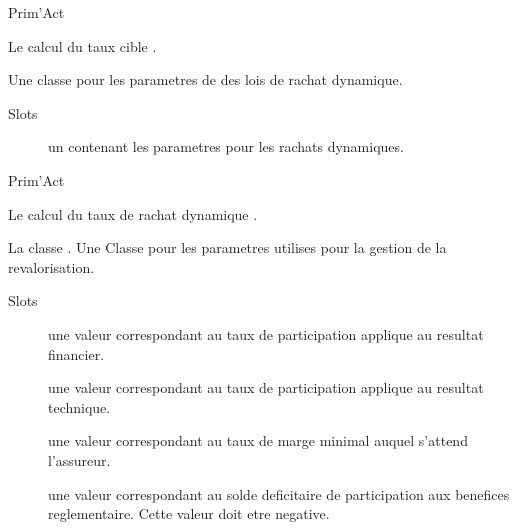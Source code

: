 \documentclass[a4paper]{book}
\begin{document}
%
\begin{Author}\relax
Prim'Act
\end{Author}
%
\begin{SeeAlso}\relax
Le calcul du taux cible .
\end{SeeAlso}
%
\begin{Description}\relax
Une classe pour les parametres de des lois de rachat dynamique.
\end{Description}
%
\begin{Section}{Slots}

\begin{description}

\item[] un  contenant les parametres pour les rachats dynamiques.

\end{description}
\end{Section}
%
\begin{Author}\relax
Prim'Act
\end{Author}
%
\begin{SeeAlso}\relax
Le calcul du taux de rachat dynamique .
\end{SeeAlso}
%
\begin{Description}\relax
La classe .
Une Classe pour les parametres utilises pour la gestion de la revalorisation.
\end{Description}
%
\begin{Section}{Slots}

\begin{description}

\item[] une valeur  correspondant au taux de participation applique au resultat financier.

\item[] une valeur  correspondant au taux de participation applique au resultat technique.

\item[] une valeur  correspondant au taux de marge minimal auquel s'attend l'assureur.

\item[] une valeur  correspondant au solde deficitaire de participation aux
benefices reglementaire. Cette valeur doit etre negative.

\end{description}
\end{Section}
\end{document}
